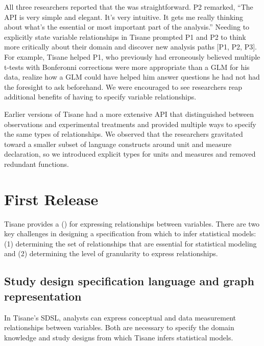 All three researchers reported that the \SDSLlong %
was straightforward. P2 remarked, ``The API is very simple and elegant. It's
very intuitive. It gets me really thinking about what's the essential or most
important part of the analysis.'' Needing to explicitly state variable
relationships in Tisane prompted P1 and P2 to think more critically about their
domain and discover new analysis paths [P1, P2, P3]. For example, Tisane helped
P1, who previously had erroneously believed multiple t-tests with Bonferonni
corrections were more appropriate than a GLM for his data, realize how a GLM
could have helped him answer questions he had not had the foresight to ask
beforehand. %
We were encouraged to see researchers reap additional benefits of having to
specify variable relationships.

Earlier versions of Tisane had a more extensive API that distinguished between
observations and experimental treatments and provided multiple ways to specify
the same types of relationships. We observed that the researchers gravitated
toward a smaller subset of language constructs around unit and measure
declaration, so we introduced explicit types for units and measures and removed
redundant functions.

\tableStudyDesignTools

\section{First Release} \label{sec:tisane}

Tisane provides a \textit{\SDSLlong} (\textit{\SDSL}) for expressing
relationships between variables. There are two key challenges in designing a
specification from which to infer statistical models: (1) determining the set of
relationships that are essential for statistical modeling and (2) determining
the level of granularity to express relationships.

\subsection{Study design specification language and graph representation} \label{sec:dsl}

In Tisane's SDSL, analysts can express conceptual and data measurement
relationships between variables. Both are necessary to specify the domain
knowledge and study designs from which Tisane infers statistical models.

